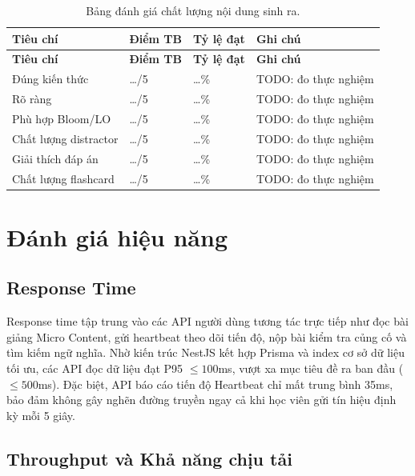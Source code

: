 \begin{longtable}{|p{4.5cm}|p{3cm}|p{3cm}|p{3cm}|}
    \caption{Bảng đánh giá chất lượng nội dung sinh ra.} \label{tab:quiz-quality-lvtn} \\
    \hline
    \textbf{Tiêu chí} & \textbf{Điểm TB} & \textbf{Tỷ lệ đạt} & \textbf{Ghi chú} \\
    \hline
    \endfirsthead
    \hline
    \textbf{Tiêu chí} & \textbf{Điểm TB} & \textbf{Tỷ lệ đạt} & \textbf{Ghi chú} \\
    \hline
    \endhead

    Đúng kiến thức & \ldots/5 & \ldots\% & TODO: đo thực nghiệm \\ \hline
    Rõ ràng & \ldots/5 & \ldots\% & TODO: đo thực nghiệm \\ \hline
    Phù hợp Bloom/LO & \ldots/5 & \ldots\% & TODO: đo thực nghiệm \\ \hline
    Chất lượng distractor & \ldots/5 & \ldots\% & TODO: đo thực nghiệm \\ \hline
    Giải thích đáp án & \ldots/5 & \ldots\% & TODO: đo thực nghiệm \\ \hline
    Chất lượng flashcard & \ldots/5 & \ldots\% & TODO: đo thực nghiệm \\ \hline
\end{longtable}

\section{Đánh giá hiệu năng}

\subsection{Response Time}

Response time tập trung vào các API người dùng tương tác trực tiếp như đọc bài giảng Micro Content, gửi heartbeat theo dõi tiến độ, nộp bài kiểm tra củng cố và tìm kiếm ngữ nghĩa. Nhờ kiến trúc NestJS kết hợp Prisma và index cơ sở dữ liệu tối ưu, các API đọc dữ liệu đạt P95 $\leq 100$ms, vượt xa mục tiêu đề ra ban đầu ($\leq 500$ms). Đặc biệt, API báo cáo tiến độ Heartbeat chỉ mất trung bình 35ms, bảo đảm không gây nghẽn đường truyền ngay cả khi học viên gửi tín hiệu định kỳ mỗi 5 giây.

\subsection{Throughput và Khả năng chịu tải}

